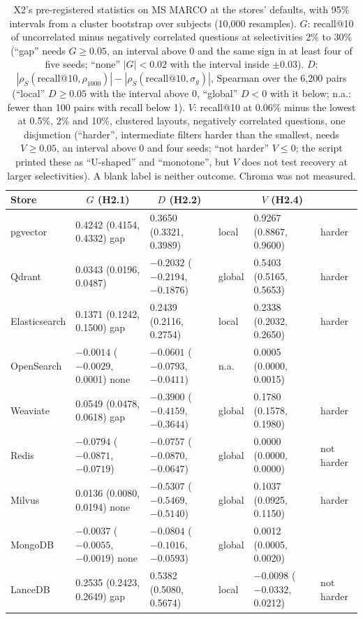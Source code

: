 \begin{table}[tbp]
\centering
\scriptsize\setlength{\tabcolsep}{3pt}
\begin{tabular}{@{}llllll@{}}
\toprule
Store & \multicolumn{1}{c}{$G$ (H2.1)} & \multicolumn{1}{c}{$D$ (H2.2)} & & \multicolumn{1}{c}{$V$ (H2.4)} & \\
\midrule
pgvector & 0.4242 (0.4154, 0.4332) gap & 0.3650 (0.3321, 0.3989) & local & 0.9267 (0.8867, 0.9600) & harder \\
Qdrant & 0.0343 (0.0196, 0.0487) & $-0.2032$ ($-0.2194$, $-0.1876$) & global & 0.5403 (0.5165, 0.5653) & harder \\
Elasticsearch & 0.1371 (0.1242, 0.1500) gap & 0.2439 (0.2116, 0.2754) & local & 0.2338 (0.2032, 0.2650) & harder \\
OpenSearch & $-0.0014$ ($-0.0029$, 0.0001) none & $-0.0601$ ($-0.0793$, $-0.0411$) & n.a. & 0.0005 (0.0000, 0.0015) & \\
Weaviate & 0.0549 (0.0478, 0.0618) gap & $-0.3900$ ($-0.4159$, $-0.3644$) & global & 0.1780 (0.1578, 0.1980) & harder \\
Redis & $-0.0794$ ($-0.0871$, $-0.0719$) & $-0.0757$ ($-0.0870$, $-0.0647$) & global & 0.0000 (0.0000, 0.0000) & not harder \\
Milvus & 0.0136 (0.0080, 0.0194) none & $-0.5307$ ($-0.5469$, $-0.5140$) & global & 0.1037 (0.0925, 0.1150) & harder \\
MongoDB & $-0.0037$ ($-0.0055$, $-0.0019$) none & $-0.0804$ ($-0.1016$, $-0.0593$) & global & 0.0012 (0.0005, 0.0020) & \\
LanceDB & 0.2535 (0.2423, 0.2649) gap & 0.5382 (0.5080, 0.5674) & local & $-0.0098$ ($-0.0332$, 0.0212) & not harder \\
\bottomrule
\end{tabular}
\caption{X2's pre-registered statistics on MS MARCO at the stores' defaults, with 95\% intervals from
a cluster bootstrap over subjects (10,000 resamples). $G$: recall@10 of uncorrelated minus negatively
correlated questions at selectivities 2\% to 30\% (``gap'' needs $G \ge 0.05$, an interval above 0 and
the same sign in at least four of five seeds; ``none'' $|G| < 0.02$ with the interval inside
$\pm 0.03$). $D$: $|\rho_S(\text{recall@10}, \rho_{1000})| - |\rho_S(\text{recall@10}, \sigma_g)|$,
Spearman over the 6,200 pairs (``local'' $D \ge 0.05$ with the interval above 0, ``global'' $D < 0$
with it below; n.a.: fewer than 100 pairs with recall below 1). $V$: recall@10 at 0.06\% minus the
lowest at 0.5\%, 2\% and 10\%, clustered layouts, negatively correlated questions, one disjunction
(``harder'', intermediate filters harder than the smallest, needs $V \ge 0.05$, an interval above 0
and four seeds; ``not harder'' $V \le 0$; the script printed these as ``U-shaped'' and ``monotone'',
but $V$ does not test recovery at larger selectivities). A blank
label is neither outcome. Chroma was not measured.}
\label{tab:qual-x2tests}
\end{table}

